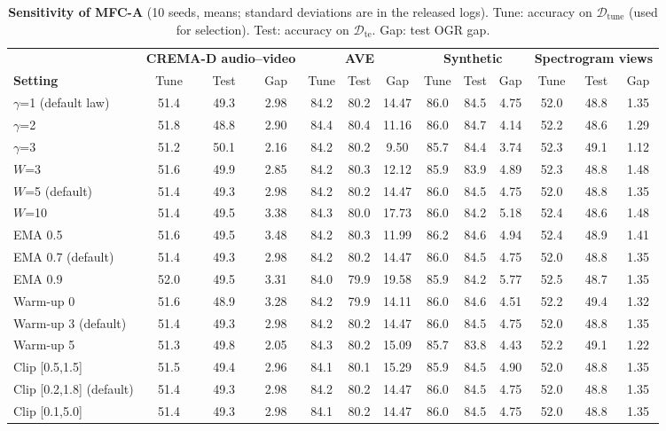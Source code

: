 \documentclass[fleqn,10pt]{wlscirep}
\begin{document}
\begin{table}[t]
\caption{\textbf{Sensitivity of MFC-A} (10 seeds, means; standard deviations are in the released logs). Tune: accuracy on $\mathcal{D}_{\mathrm{tune}}$ (used for selection). Test: accuracy on $\mathcal{D}_{\mathrm{te}}$. Gap: test OGR gap.}
\label{tab:sens}
\centering
\footnotesize
\setlength{\tabcolsep}{2.5pt}
\begin{tabular}{@{}lcccccccccccc@{}}
\toprule
& \multicolumn{3}{c}{\textbf{CREMA-D audio--video}} & \multicolumn{3}{c}{\textbf{AVE}} & \multicolumn{3}{c}{\textbf{Synthetic}} & \multicolumn{3}{c}{\textbf{Spectrogram views}} \\
\cmidrule(lr){2-4}\cmidrule(lr){5-7}\cmidrule(lr){8-10}\cmidrule(lr){11-13}
\textbf{Setting} & Tune & Test & Gap & Tune & Test & Gap & Tune & Test & Gap & Tune & Test & Gap \\ \midrule
$\gamma$=1 (default law) & 51.4 & 49.3 & 2.98 & 84.2 & 80.2 & 14.47 & 86.0 & 84.5 & 4.75 & 52.0 & 48.8 & 1.35 \\
$\gamma$=2 & 51.8 & 48.8 & 2.90 & 84.4 & 80.4 & 11.16 & 86.0 & 84.7 & 4.14 & 52.2 & 48.6 & 1.29 \\
$\gamma$=3 & 51.2 & 50.1 & 2.16 & 84.2 & 80.2 & 9.50 & 85.7 & 84.4 & 3.74 & 52.3 & 49.1 & 1.12 \\
$W$=3 & 51.6 & 49.9 & 2.85 & 84.2 & 80.3 & 12.12 & 85.9 & 83.9 & 4.89 & 52.3 & 48.8 & 1.48 \\
$W$=5 (default) & 51.4 & 49.3 & 2.98 & 84.2 & 80.2 & 14.47 & 86.0 & 84.5 & 4.75 & 52.0 & 48.8 & 1.35 \\
$W$=10 & 51.4 & 49.5 & 3.38 & 84.3 & 80.0 & 17.73 & 86.0 & 84.2 & 5.18 & 52.4 & 48.6 & 1.48 \\
EMA 0.5 & 51.6 & 49.5 & 3.48 & 84.2 & 80.3 & 11.99 & 86.2 & 84.6 & 4.94 & 52.4 & 48.9 & 1.41 \\
EMA 0.7 (default) & 51.4 & 49.3 & 2.98 & 84.2 & 80.2 & 14.47 & 86.0 & 84.5 & 4.75 & 52.0 & 48.8 & 1.35 \\
EMA 0.9 & 52.0 & 49.5 & 3.31 & 84.0 & 79.9 & 19.58 & 85.9 & 84.2 & 5.77 & 52.5 & 48.7 & 1.35 \\
Warm-up 0 & 51.6 & 48.9 & 3.28 & 84.2 & 79.9 & 14.11 & 86.0 & 84.6 & 4.51 & 52.2 & 49.4 & 1.32 \\
Warm-up 3 (default) & 51.4 & 49.3 & 2.98 & 84.2 & 80.2 & 14.47 & 86.0 & 84.5 & 4.75 & 52.0 & 48.8 & 1.35 \\
Warm-up 5 & 51.3 & 49.8 & 2.05 & 84.3 & 80.2 & 15.09 & 85.7 & 83.8 & 4.43 & 52.2 & 49.1 & 1.22 \\
Clip [0.5,1.5] & 51.5 & 49.4 & 2.96 & 84.1 & 80.1 & 15.29 & 85.9 & 84.5 & 4.90 & 52.0 & 48.8 & 1.35 \\
Clip [0.2,1.8] (default) & 51.4 & 49.3 & 2.98 & 84.2 & 80.2 & 14.47 & 86.0 & 84.5 & 4.75 & 52.0 & 48.8 & 1.35 \\
Clip [0.1,5.0] & 51.4 & 49.3 & 2.98 & 84.1 & 80.2 & 14.47 & 86.0 & 84.5 & 4.75 & 52.0 & 48.8 & 1.35 \\
\bottomrule
\end{tabular}
\end{table}
\end{document}
